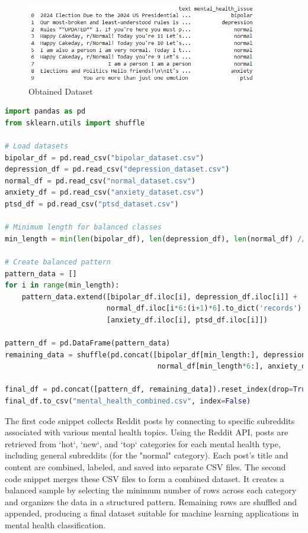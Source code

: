     \begin{figure}[h!]  
        \centering
        \includegraphics[width=0.9\textwidth]{Images/Dataset.png}  
        \caption{Obtained Dataset}
        \label{LSTMROC711}  %
    \end{figure}


\begin{tcolorbox}[colback=gray!5!white, colframe=gray!80!black, boxrule=0.5pt, title=Combining Collected Datasets]
\begin{lstlisting}[language=Python]
import pandas as pd
from sklearn.utils import shuffle

# Load datasets
bipolar_df = pd.read_csv("bipolar_dataset.csv")
depression_df = pd.read_csv("depression_dataset.csv")
normal_df = pd.read_csv("normal_dataset.csv")
anxiety_df = pd.read_csv("anxiety_dataset.csv")
ptsd_df = pd.read_csv("ptsd_dataset.csv")

# Minimum length for balanced classes
min_length = min(len(bipolar_df), len(depression_df), len(normal_df) // 6, len(anxiety_df), len(ptsd_df))

# Create balanced pattern
pattern_data = []
for i in range(min_length):
    pattern_data.extend([bipolar_df.iloc[i], depression_df.iloc[i]] +
                        normal_df.iloc[i*6:(i+1)*6].to_dict('records') +
                        [anxiety_df.iloc[i], ptsd_df.iloc[i]])

pattern_df = pd.DataFrame(pattern_data)
remaining_data = shuffle(pd.concat([bipolar_df[min_length:], depression_df[min_length:], 
                                    normal_df[min_length*6:], anxiety_df[min_length:], ptsd_df[min_length:]]))

final_df = pd.concat([pattern_df, remaining_data]).reset_index(drop=True)
final_df.to_csv("mental_health_combined.csv", index=False)
\end{lstlisting}
\end{tcolorbox}
    
\noindent
The first code snippet collects Reddit posts by connecting to specific subreddits associated with various mental health topics. Using the Reddit API, posts are retrieved from `hot`, `new`, and `top` categories for each mental health type, including general subreddits (for the "normal" category). Each post’s title and content are combined, labeled, and saved into separate CSV files. The second code snippet merges these CSV files to form a combined dataset. It creates a balanced sample by selecting the minimum number of rows across each category and organizes the data in a structured pattern. Remaining rows are shuffled and appended, producing a final dataset suitable for machine learning applications in mental health classification.
    


